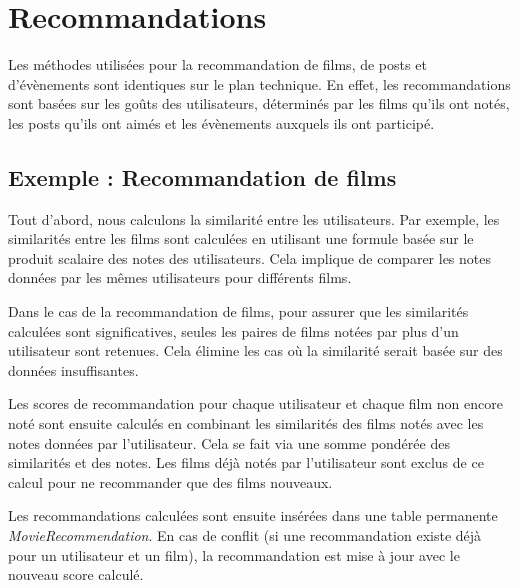 \section{Recommandations}

Les méthodes utilisées pour la recommandation de films, de posts et d'évènements sont identiques sur le plan technique. En effet, les recommandations sont basées sur les goûts des utilisateurs, déterminés par les films qu'ils ont notés, les posts qu'ils ont aimés et les évènements auxquels ils ont participé.

\subsection*{Exemple : Recommandation de films}
Tout d'abord, nous calculons la similarité entre les utilisateurs. Par exemple, les similarités entre les films sont calculées en utilisant une formule basée sur le produit scalaire des notes des utilisateurs. Cela implique de comparer les notes données par les mêmes utilisateurs pour différents films.

Dans le cas de la recommandation de films, pour assurer que les similarités calculées sont significatives, seules les paires de films notées par plus d'un utilisateur sont retenues. Cela élimine les cas où la similarité serait basée sur des données insuffisantes.

Les scores de recommandation pour chaque utilisateur et chaque film non encore noté sont ensuite calculés en combinant les similarités des films notés avec les notes données par l'utilisateur. Cela se fait via une somme pondérée des similarités et des notes. Les films déjà notés par l'utilisateur sont exclus de ce calcul pour ne recommander que des films nouveaux.

Les recommandations calculées sont ensuite insérées dans une table permanente \textit{MovieRecommendation}. En cas de conflit (si une recommandation existe déjà pour un utilisateur et un film), la recommandation est mise à jour avec le nouveau score calculé.

